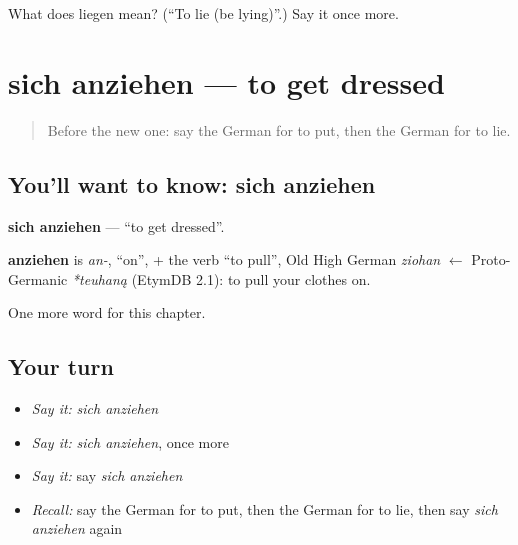 \begin{tcolorbox}[breakable,colback=teal!4,colframe=teal!35!black,title={Before you move on}]
What does liegen mean? (\textquotedblleft{}To lie (be lying)\textquotedblright{}.) Say it once more.
\end{tcolorbox}
\section[sich anziehen]{sich anziehen — to get dressed}

\label{lesson:GE-C140-sich-anziehen}



\begin{quote}
Before the new one: say the German for to put, then the German for to lie.
\end{quote}

\subsection*{You'll want to know: sich anziehen}
\textbf{sich anziehen} — \textquotedblleft{}to get dressed\textquotedblright{}.

\begin{cousinweb}
\textbf{anziehen} is \emph{an-}, \textquotedblleft{}on\textquotedblright{}, + the verb \textquotedblleft{}to pull\textquotedblright{}, Old High German \emph{ziohan} $\leftarrow$ Proto-Germanic \emph{*teuhaną} (EtymDB 2.1): to pull your clothes on.
\end{cousinweb}

\begin{grammarlens}[title={What you've built}]
One more word for this chapter.
\end{grammarlens}

\subsection*{Your turn}
\begin{itemize}
\raggedright
  \item \emph{Say it:} \emph{sich anziehen}
  \item \emph{Say it:} \emph{sich anziehen}, once more
  \item \emph{Say it:} say \emph{sich anziehen}
  \item \emph{Recall:} say the German for to put, then the German for to lie, then say \emph{sich anziehen} again
\end{itemize}

